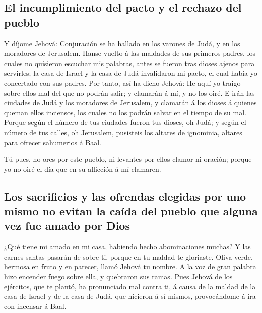 \hypertarget{el-incumplimiento-del-pacto-y-el-rechazo-del-pueblo}{%
\subsection{El incumplimiento del pacto y el rechazo del
pueblo}\label{el-incumplimiento-del-pacto-y-el-rechazo-del-pueblo}}

 Y díjome Jehová: Conjuración se ha hallado en los varones
de Judá, y en los moradores de Jerusalem.  Hanse vuelto á
las maldades de sus primeros padres, los cuales no quisieron escuchar
mis palabras, antes se fueron tras dioses ajenos para servirles; la casa
de Israel y la casa de Judá invalidaron mi pacto, el cual había yo
concertado con sus padres.  Por tanto, así ha dicho Jehová:
He aquí yo traigo sobre ellos mal del que no podrán salir; y clamarán á
mí, y no los oiré.  E irán las ciudades de Judá y los
moradores de Jerusalem, y clamarán á los dioses á quienes queman ellos
inciensos, los cuales no los podrán salvar en el tiempo de su mal.
 Porque según el número de tus ciudades fueron tus dioses,
oh Judá; y según el número de tus calles, oh Jerusalem, pusisteis los
altares de ignominia, altares para ofrecer sahumerios á Baal.

 Tú pues, no ores por este pueblo, ni levantes por ellos
clamor ni oración; porque yo no oiré el día que en su aflicción á mí
clamaren.

\hypertarget{los-sacrificios-y-las-ofrendas-elegidas-por-uno-mismo-no-evitan-la-cauxedda-del-pueblo-que-alguna-vez-fue-amado-por-dios}{%
\subsection{Los sacrificios y las ofrendas elegidas por uno mismo no
evitan la caída del pueblo que alguna vez fue amado por
Dios}\label{los-sacrificios-y-las-ofrendas-elegidas-por-uno-mismo-no-evitan-la-cauxedda-del-pueblo-que-alguna-vez-fue-amado-por-dios}}

 ¿Qué tiene mi amado en mi casa, habiendo hecho
abominaciones muchas? Y las carnes santas pasarán de sobre ti, porque en
tu maldad te gloriaste.  Oliva verde, hermosa en fruto y en
parecer, llamó Jehová tu nombre. A la voz de gran palabra hizo encender
fuego sobre ella, y quebraron sus ramas.  Pues Jehová de
los ejércitos, que te plantó, ha pronunciado mal contra ti, á causa de
la maldad de la casa de Israel y de la casa de Judá, que hicieron á sí
mismos, provocándome á ira con incensar á Baal.

